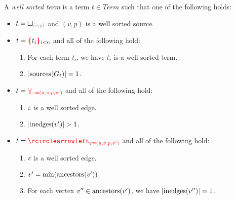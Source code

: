 \begin{definition}
  A \emph{well sorted term} is a term $t \in Term$ such that one of the following holds:
  \begin{itemize}

    \item $t = \emptyHole{v}{p}$ and $(v, p)$ is a well sorted source.

    \item $t = \conflictHole[i < n]{t_i}$ and all of the following hold:
      \begin{enumerate}
        \item For each term $t_i$, we have $t_i$ is a well sorted term.
        \item $\left\lvert\text{sources}\mathopen{}\left(G_t\right)\mathclose{}\right\rvert = 1$.
      \end{enumerate}

    \item $t = \textcolor{red}{\curlyveedownarrow_{\varepsilon{=}(u, v, p, v')}}$ and all of the following hold:
      \begin{enumerate}
        \item $\varepsilon$ is a well sorted edge.
        \item $\left\lvert\text{inedges}\mathopen{}\left(v'\right)\mathclose{}\right\rvert > 1$.
      \end{enumerate}

    \item $t = \cycleVertex{\e{=}(u, v, p, v')}$ and all of the following hold:
      \begin{enumerate}
        \item $\varepsilon$ is a well sorted edge.
        \item $v' = \operatorname{\text{min}}\mathopen{}\left(\operatorname{\text{ancestors}}\mathopen{}\left(v'\right)\mathclose{}\right)\mathclose{}$
        \item For each vertex $v'' \in \operatorname{\text{ancestors}}\mathopen{}\left(v'\right)\mathclose{}$, we have $\left\lvert\text{inedges}\mathopen{}\left(v''\right)\mathclose{}\right\rvert = 1$.
      \end{enumerate}


\end{itemize}
\end{definition}
